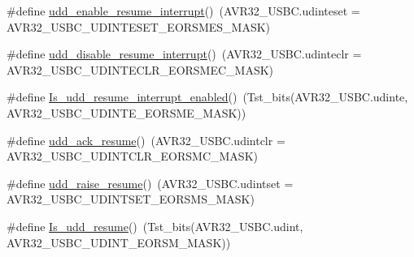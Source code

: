 \begin{DoxyCompactItemize}
\item 
\#define \hyperlink{group__udd__group_gad7f806ed3fbecb776acc5dcedcf81f3e}{udd\-\_\-enable\-\_\-resume\-\_\-interrupt}()~(\-A\-V\-R32\-\_\-\-U\-S\-B\-C.\-udinteset = \-A\-V\-R32\-\_\-\-U\-S\-B\-C\-\_\-\-U\-D\-I\-N\-T\-E\-S\-E\-T\-\_\-\-E\-O\-R\-S\-M\-E\-S\-\_\-\-M\-A\-S\-K)
\item 
\#define \hyperlink{group__udd__group_ga8a97ab6519a34ae7d9135fe70c6719e4}{udd\-\_\-disable\-\_\-resume\-\_\-interrupt}()~(\-A\-V\-R32\-\_\-\-U\-S\-B\-C.\-udinteclr = \-A\-V\-R32\-\_\-\-U\-S\-B\-C\-\_\-\-U\-D\-I\-N\-T\-E\-C\-L\-R\-\_\-\-E\-O\-R\-S\-M\-E\-C\-\_\-\-M\-A\-S\-K)
\item 
\#define \hyperlink{group__udd__group_ga3cad513921d4190558aa7744d672bfc3}{\-Is\-\_\-udd\-\_\-resume\-\_\-interrupt\-\_\-enabled}()~(\-Tst\-\_\-bits(\-A\-V\-R32\-\_\-\-U\-S\-B\-C.\-udinte, \-A\-V\-R32\-\_\-\-U\-S\-B\-C\-\_\-\-U\-D\-I\-N\-T\-E\-\_\-\-E\-O\-R\-S\-M\-E\-\_\-\-M\-A\-S\-K))
\item 
\#define \hyperlink{group__udd__group_gabc25572243c4ab4600a1a870b4b6028b}{udd\-\_\-ack\-\_\-resume}()~(\-A\-V\-R32\-\_\-\-U\-S\-B\-C.\-udintclr = \-A\-V\-R32\-\_\-\-U\-S\-B\-C\-\_\-\-U\-D\-I\-N\-T\-C\-L\-R\-\_\-\-E\-O\-R\-S\-M\-C\-\_\-\-M\-A\-S\-K)
\item 
\#define \hyperlink{group__udd__group_ga32a47c6752a2cac56874691e34728ba5}{udd\-\_\-raise\-\_\-resume}()~(\-A\-V\-R32\-\_\-\-U\-S\-B\-C.\-udintset = \-A\-V\-R32\-\_\-\-U\-S\-B\-C\-\_\-\-U\-D\-I\-N\-T\-S\-E\-T\-\_\-\-E\-O\-R\-S\-M\-S\-\_\-\-M\-A\-S\-K)
\item 
\#define \hyperlink{group__udd__group_ga1b2ed8acdccb1fa2d295610349979fe5}{\-Is\-\_\-udd\-\_\-resume}()~(\-Tst\-\_\-bits(\-A\-V\-R32\-\_\-\-U\-S\-B\-C.\-udint, \-A\-V\-R32\-\_\-\-U\-S\-B\-C\-\_\-\-U\-D\-I\-N\-T\-\_\-\-E\-O\-R\-S\-M\-\_\-\-M\-A\-S\-K))
\end{DoxyCompactItemize}
